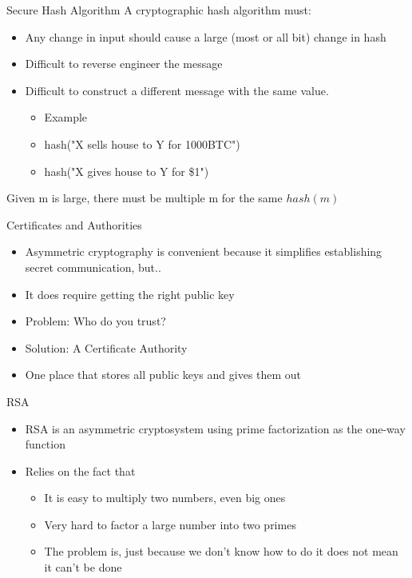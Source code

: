 \begin{frame}{Secure Hash Algorithm}
    A cryptographic hash algorithm must:
    \begin{itemize}
        \item Any change in input should cause a large (most or all bit) change in hash
        \item Difficult to reverse engineer the message
        \item Difficult to construct a different message with the same value.
        \begin{itemize}
            \item Example
            \item hash("X sells house to Y for 1000BTC") %
            \item hash("X gives house to Y for \$1")     %
        \end{itemize}
    \end{itemize}
    Given m is large, there must be multiple m for the same $hash(m)$
\end{frame}

\begin{frame}{Certificates and Authorities}
    \begin{itemize}
        \item Asymmetric cryptography is convenient because it simplifies establishing secret communication, but..
        \item It does require getting the right public key
        \item Problem: Who do you trust?
        \item Solution: A Certificate Authority
        \item One place that stores all public keys and gives them out
    \end{itemize}
\end{frame}


\begin{frame}{RSA}
    \begin{itemize}
        \item RSA is an asymmetric cryptosystem using prime factorization as the one-way function
        \item Relies on the fact that
        \begin{itemize}
            \item It is easy to multiply two numbers, even big ones
            \item Very hard to factor a large number into two primes
            \item The problem is, just because we don't know how to do it does not mean it can't be done
        \end{itemize}
    \end{itemize}
\end{frame}

